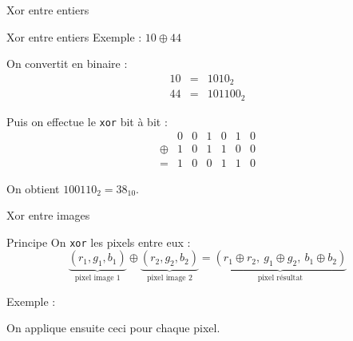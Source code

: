 \documentclass{beamer}
\begin{document}
    \begin{frame}{Xor entre entiers}%
        \begin{block}{Xor entre entiers}%
            Exemple :
            $10 \oplus 44$

            On convertit en binaire :
            \[
                \begin{array}{rcl}
                    10 &=& 1010_2
                    \\
                    44 &=& 101100_2
                \end{array}
            \]

            Puis on effectue le \texttt{xor} bit à bit :
            \[
                \begin{array}{ccccccc}
                    & 0 & 0 & 1 & 0 & 1 & 0
                    \\
                    \oplus
                    & 1 & 0 & 1 & 1 & 0 & 0
                    \\
                    \hline
                    =
                    & 1 & 0 & 0 & 1 & 1 & 0
                \end{array}
            \]

            On obtient $100110_2 = 38_{10}$.
        \end{block}%
    \end{frame}%

    \begin{frame}{Xor entre images}%
        \begin{block}{Principe}%
            On \texttt{xor} les pixels entre eux :
            \[
                \underbrace{(r_1, g_1, b_1)}_{\text{pixel image 1}}
                \oplus
                \underbrace{(r_2, g_2, b_2)}_{\text{pixel image 2}}
                =
                \underbrace{(r_1 \oplus r_2,\ g_1 \oplus g_2,\ b_1 \oplus b_2)}_{\text{pixel résultat}}
            \]
        \end{block}%

        \begin{block}{Exemple :}%
            \begin{center}
            \end{center}
        \end{block}%

        On applique ensuite ceci pour chaque pixel.
    \end{frame}%
\end{document}
